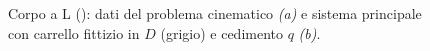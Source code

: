 \begin{figure}[ht]
		\caption{Corpo a L
			(): dati del problema
			cinematico \emph{(a)} e sistema principale con
			carrello fittizio in $D$ (grigio) e cedimento
			$q$ \emph{(b)}.}
		\label{fig:labile_L}
	\end{figure}
